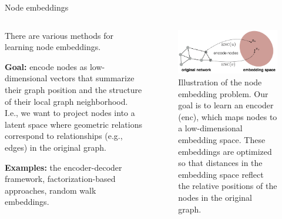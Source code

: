 \documentclass[10pt, aspectratio=169, compress, protectframetitle, handout]{beamer}
\begin{document}
\begin{frame}{Node embeddings}

    \begin{columns}
        \begin{column}{.45\textwidth}
        There are various methods for learning \alert{node embeddings}.
        \medskip
        
        \textbf{Goal:} encode nodes as low-dimensional vectors that summarize their graph position and the structure of their local graph neighborhood. I.e., we want to project nodes into a latent space where geometric relations correspond to relationships (e.g., edges) in the original graph.
        \medskip
        
        \textbf{Examples:} the encoder-decoder framework, factorization-based approaches, random walk embeddings.
        \end{column}
        
        \begin{column}{.55\textwidth}
        \begin{figure}[ht]
            \centering
            \includegraphics[width=\textwidth]{figures/Node_embedding.png}
            \caption{Illustration of the node embedding problem. Our goal is to learn an encoder (enc), which maps nodes to a low-dimensional embedding space. These embeddings are optimized so that distances in the embedding space reflect the relative positions of the nodes in the original graph.}
            \label{fig:nodeembedding}
        \end{figure}
        \end{column}
    \end{columns}
    
\end{frame}
\end{document}
